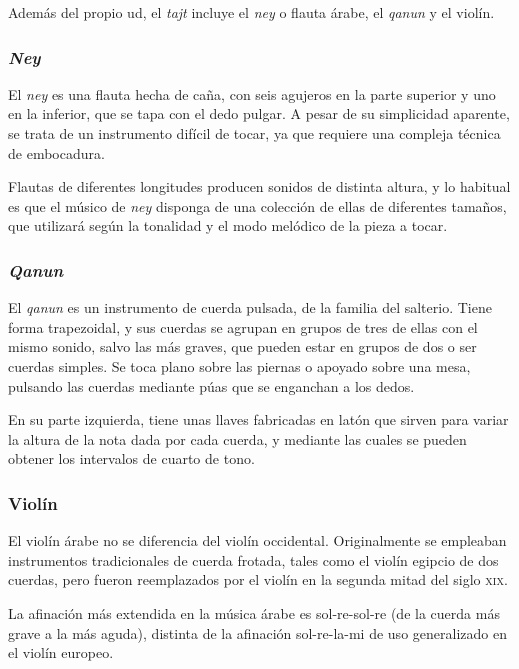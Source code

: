     Además del propio ud, el \emph{tajt} incluye el \emph{ney} o flauta árabe, el \emph{qanun} y el violín.

    \subsubsection{\emph{Ney}}

    El \emph{ney} es una flauta hecha de caña, con seis agujeros en la parte superior y uno en la inferior, que se tapa con el dedo pulgar. A pesar de su simplicidad aparente, se trata de un instrumento difícil de tocar, ya que requiere una compleja técnica de embocadura.

    Flautas de diferentes longitudes producen sonidos de distinta altura, y lo habitual es que el músico de \emph{ney} disponga de una colección de ellas de diferentes tamaños, que utilizará según la tonalidad y el modo melódico de la pieza a tocar.


    \subsubsection{\emph{Qanun}}

    El \emph{qanun} es un instrumento de cuerda pulsada, de la familia del salterio. Tiene forma trapezoidal, y sus cuerdas se agrupan en grupos de tres de ellas con el mismo sonido, salvo las más graves, que pueden estar en grupos de dos o ser cuerdas simples. Se toca plano sobre las piernas o apoyado sobre una mesa, pulsando las cuerdas mediante púas que se enganchan a los dedos.

    En su parte izquierda, tiene unas llaves fabricadas en latón que sirven para variar la altura de la nota dada por cada cuerda, y mediante las cuales se pueden obtener los intervalos de cuarto de tono.


    \subsubsection{Violín}

    El violín árabe no se diferencia del violín occidental. Originalmente se empleaban instrumentos tradicionales de cuerda frotada, tales como el violín egipcio de dos cuerdas, pero fueron reemplazados por el violín en la segunda mitad del siglo \textsc{xix}.

    La afinación más extendida en la música árabe es sol-re-sol-re (de la cuerda más grave a la más aguda), distinta de la afinación sol-re-la-mi de uso generalizado en el violín europeo.

